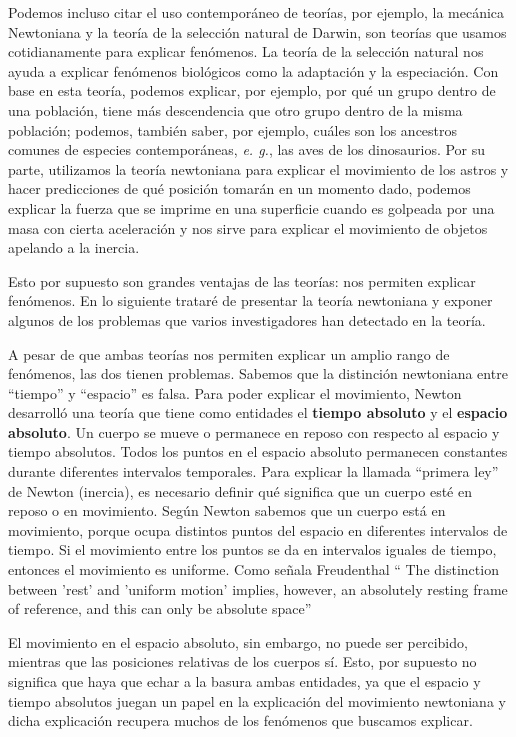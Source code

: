 \documentclass[12pt]{article}
\begin{document}
Podemos incluso citar el uso contemporáneo de teorías, por ejemplo, la mecánica Newtoniana y la teoría de la selección natural de Darwin, son teorías que usamos cotidianamente para explicar fenómenos. La teoría de la selección natural nos ayuda a explicar fenómenos biológicos como la adaptación y la especiación. Con base en esta teoría, podemos explicar, por ejemplo, por qué un grupo dentro de una población, tiene más descendencia que otro grupo dentro de la misma población; podemos, también saber, por ejemplo, cuáles son los ancestros comunes de especies contemporáneas, \textit{e. g.}, las aves de los dinosaurios. Por su parte, utilizamos la teoría newtoniana para explicar el movimiento de los astros y hacer predicciones de qué posición tomarán en un momento dado, podemos explicar la fuerza que se imprime en una superficie cuando es golpeada por una masa con cierta aceleración y nos sirve para explicar el movimiento de objetos apelando a la inercia.

Esto por supuesto son grandes ventajas de las teorías: nos permiten explicar fenómenos. En lo siguiente trataré de presentar la teoría newtoniana y exponer algunos de los problemas que varios investigadores han detectado en la teoría.

A pesar de que ambas teorías nos permiten explicar un amplio rango de fenómenos, las dos tienen problemas. Sabemos que la distinción newtoniana entre ``tiempo'' y ``espacio'' es falsa. Para poder explicar el movimiento, Newton desarrolló una teoría que tiene como entidades el \textbf{tiempo absoluto} y el \textbf{espacio absoluto}. Un cuerpo se mueve o permanece en reposo con respecto al espacio y tiempo absolutos. Todos los puntos en el espacio absoluto permanecen constantes durante diferentes intervalos temporales. Para explicar la llamada ``primera ley''  de Newton (inercia), es necesario definir qué significa que un cuerpo esté en reposo o en movimiento. Según Newton sabemos que un cuerpo está en movimiento, porque ocupa distintos puntos del espacio en diferentes intervalos de tiempo. Si el movimiento entre los puntos se da en intervalos iguales de tiempo, entonces el movimiento es uniforme. Como señala Freudenthal `` The distinction between 'rest' and 'uniform motion' implies, however, an absolutely resting frame of reference, and this can only be absolute space'' \citeyear{Freudenthal1986}

El movimiento en el espacio absoluto, sin embargo, no puede ser percibido, mientras que las posiciones relativas de los cuerpos sí. Esto, por supuesto no significa que haya que echar a la basura ambas entidades, ya que el espacio y tiempo absolutos juegan un papel en la explicación del movimiento newtoniana y dicha explicación recupera muchos de los fenómenos que buscamos explicar.
\end{document}
